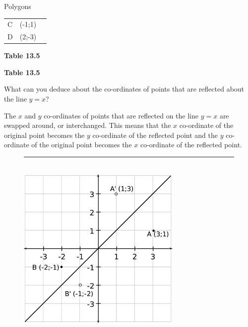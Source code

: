 \begin{exercises}{Polygons}
\begin{table}[H]
\begin{center}
\begin{xtabular}[t]{|l|l|l|}
    
        C &
    
    
        (-1;1) &
    
    
     \tabularnewline{}
    
    
        D &
    
    
        (2;-3) &
    
    
     \tabularnewline{}
    \end{xtabular}
      \end{center}
    \begin{center}{\small\bfseries Table 13.5}\end{center}
    \begin{caption}{\small\bfseries Table 13.5}\end{caption}
\end{table}
      
    \par
  
          
          \label{m39358*id72055}What can you deduce about the co-ordinates of points that are reflected about the line $y=x$? \par 

          \label{m39358*id72080}The $x$ and $y$ co-ordinates of points that are reflected on the line $y=x$ are swapped around, or interchanged. This means that the $x$ co-ordinate of the original point becomes the $y$ co-ordinate of the reflected point and the $y$ co-ordinate of the original point becomes the $x$ co-ordinate of the reflected point.\par 
          
    \setcounter{subfigure}{0}


	\begin{figure}[H] %
    \begin{center}
    \rule[.1in]{\figurerulewidth}{.005in} \\
        \label{m39358*uid7568!!!underscore!!!media}\label{m39358*uid7568!!!underscore!!!printimage}\includegraphics[width=300px]{col11306.imgs/m39358_MG10C14_030.png} %
        

\end{center}
\end{figure}
\end{exercises}
